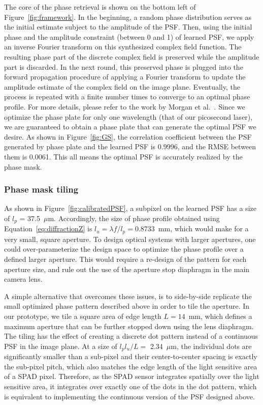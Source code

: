 The core of the phase retrieval is shown on the bottom left of
Figure~\ref{fig:framework}. In the beginning, a random phase
distribution serves as the initial estimate subject to the amplitude
of the PSF.  Then, using the initial phase and the amplitude
constraint (between 0 and 1) of learned PSF, we apply an inverse
Fourier transform on this synthesized complex field function.  The
resulting phase part of the discrete complex field is preserved while
the amplitude part is discarded. In the next round, this preserved
phase is plugged into the forward propagation procedure of applying a
Fourier transform to update the amplitude estimate of the complex
field on the image plane.  Eventually, the process is repeated with a
finite number times to converge to an optimal phase profile. For more
details, please refer to the work by Morgan et
al.~. Since we optimize the
  phase plate for only one wavelength (that of our picosecond laser),
  we are guaranteed to obtain a phase plate that can generate the
  optimal PSF we desire. As shown in Figure~\ref{fig:GS}, the
  correlation coefficient between the PSF generated by phase plate and
  the learned PSF is 0.9996, and the RMSE between them is 0.0061. This
  all means the optimal PSF is accurately realized by the phase mask.
 


\subsubsection{Phase mask tiling}
\label{sec:phaskMaskDesign}
As shown in Figure~\ref{fig:calibratedPSF}, a subpixel on the learned
PSF has a size of $l_{p}$ = 37.5~$\mu$m. Accordingly, the size of
phase profile obtained using Equation~\ref{eq:diffractionZ} is $l_{u}
= \lambda f / l_{p} = 0.8733$~mm, which would make for a very small,
square aperture. To design optical systems with larger apertures, one
could over-parameterize the design space to optimize the phase profile
over a defined larger aperture. This would require a re-design of the
pattern for each aperture size, and rule out the use of the aperture
stop diaphragm in the main camera lens.

 

A simple alternative that overcomes these issues, is to side-by-side
replicate the small optimized phase pattern described above in order
to tile the aperture. In our prototype, we tile a square area of edge
length $L=14$~mm, which defines a maximum aperture that can be further
stopped down using the lens diaphragm.  The tiling has the effect of
creating a discrete dot pattern instead of a continuous PSF in the
image plane. At a size of $l_{p} l_{u}/L=$ 2.34~$\mu$m, the individual
dots are significantly smaller than a sub-pixel and their
center-to-center spacing is exactly the sub-pixel pitch, which also
matches the edge length of the light sensitive area of a SPAD
pixel. Therefore, as the SPAD sensor integrates spatially over the
light sensitive area, it integrates over exactly one of the dots in
the dot pattern, which is equivalent to implementing the continuous
version of the PSF designed above.

